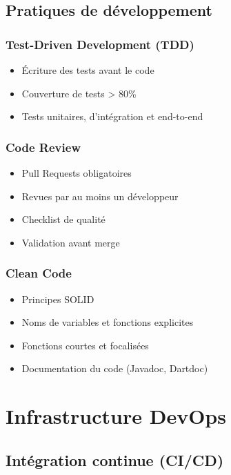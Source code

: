 \documentclass[a4paper,11pt]{report}
\begin{document}
\subsection{Pratiques de développement}

\subsubsection{Test-Driven Development (TDD)}

\begin{itemize}
    \item Écriture des tests avant le code
    \item Couverture de tests > 80\%
    \item Tests unitaires, d'intégration et end-to-end
\end{itemize}

\subsubsection{Code Review}

\begin{itemize}
    \item Pull Requests obligatoires
    \item Revues par au moins un développeur
    \item Checklist de qualité
    \item Validation avant merge
\end{itemize}

\subsubsection{Clean Code}

\begin{itemize}
    \item Principes SOLID
    \item Noms de variables et fonctions explicites
    \item Fonctions courtes et focalisées
    \item Documentation du code (Javadoc, Dartdoc)
\end{itemize}

\section{Infrastructure DevOps}

\subsection{Intégration continue (CI/CD)}
\end{document}
